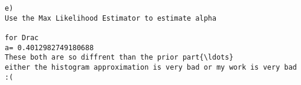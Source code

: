 \documentclass[11pt]{article}
\begin{document}
    \begin{Verbatim}[commandchars=\\\{\}]
e)
Use the Max Likelihood Estimator to estimate alpha

for Drac
a= 0.4012982749180688 
These both are so diffrent than the prior part{\ldots}
either the histogram approximation is very bad or my work is very bad :(

    \end{Verbatim}


    
    
    
    
\end{document}
